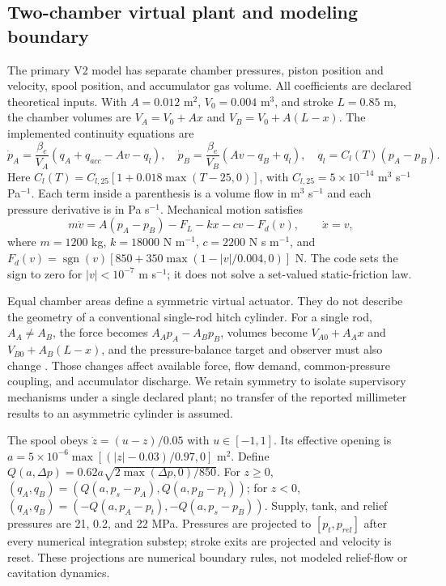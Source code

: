 \documentclass[machines,article,submit,pdftex,moreauthors]{Definitions/mdpi}
\begin{document}
\subsection{Two-chamber virtual plant and modeling boundary}
The primary V2 model has separate chamber pressures, piston position and velocity, spool position, and accumulator gas volume. All coefficients are declared theoretical inputs. With $A=0.012$ m$^2$, $V_0=0.004$ m$^3$, and stroke $L=0.85$ m, the chamber volumes are $V_A=V_0+Ax$ and $V_B=V_0+A(L-x)$. The implemented continuity equations are
\begin{equation}
\dot p_A=\frac{\beta_e}{V_A}(q_A+q_{acc}-Av-q_l),\quad
\dot p_B=\frac{\beta_e}{V_B}(Av-q_B+q_l),\quad
q_l=C_l(T)(p_A-p_B).
\label{eq:continuity}
\end{equation}
Here $C_l(T)=C_{l,25}[1+0.018\max(T-25,0)]$, with $C_{l,25}=5\times10^{-14}$ m$^3$ s$^{-1}$ Pa$^{-1}$. Each term inside a parenthesis is a volume flow in m$^3$ s$^{-1}$ and each pressure derivative is in Pa s$^{-1}$. Mechanical motion satisfies
\begin{equation}
m\dot v=A(p_A-p_B)-F_L-kx-cv-F_d(v),\qquad \dot x=v,
\label{eq:mechanical}
\end{equation}
where $m=1200$ kg, $k=18000$ N m$^{-1}$, $c=2200$ N s m$^{-1}$, and $F_d(v)=\operatorname{sgn}(v)[850+350\max(1-|v|/0.004,0)]$ N. The code sets the sign to zero for $|v|<10^{-7}$ m s$^{-1}$; it does not solve a set-valued static-friction law.

Equal chamber areas define a symmetric virtual actuator. They do not describe the geometry of a conventional single-rod hitch cylinder. For a single rod, $A_A\ne A_B$, the force becomes $A_Ap_A-A_Bp_B$, volumes become $V_{A0}+A_Ax$ and $V_{B0}+A_B(L-x)$, and the pressure-balance target and observer must also change \cite{yao2000,ketelsen2019}. Those changes affect available force, flow demand, common-pressure coupling, and accumulator discharge. We retain symmetry to isolate supervisory mechanisms under a single declared plant; no transfer of the reported millimeter results to an asymmetric cylinder is assumed.

The spool obeys $\dot z=(u-z)/0.05$ with $u\in[-1,1]$. Its effective opening is $a=5\times10^{-6}\max[(|z|-0.03)/0.97,0]$ m$^2$. Define $Q(a,\Delta p)=0.62a\sqrt{2\max(\Delta p,0)/850}$. For $z\ge0$, $(q_A,q_B)=(Q(a,p_s-p_A),Q(a,p_B-p_t))$; for $z<0$, $(q_A,q_B)=(-Q(a,p_A-p_t),-Q(a,p_s-p_B))$. Supply, tank, and relief pressures are 21, 0.2, and 22 MPa. Pressures are projected to $[p_t,p_{rel}]$ after every numerical integration substep; stroke exits are projected and velocity is reset. These projections are numerical boundary rules, not modeled relief-flow or cavitation dynamics.
\end{document}
